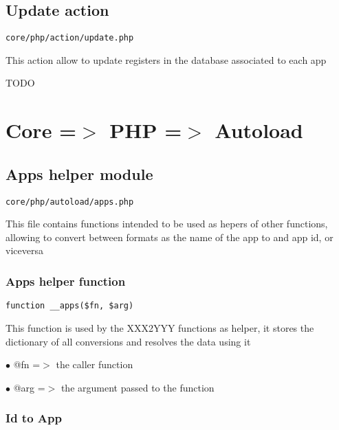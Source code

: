 \documentclass[a4paper]{book}
\begin{document}
\hypertarget{toc17}{}
\section{Update action}

\begin{lstlisting}
core/php/action/update.php
\end{lstlisting}

This action allow to update registers in the database associated to
each app

TODO


\hypertarget{toc18}{}
\chapter{Core =$>$ PHP =$>$ Autoload}

\hypertarget{toc19}{}
\section{Apps helper module}

\begin{lstlisting}
core/php/autoload/apps.php
\end{lstlisting}

This file contains functions intended to be used as hepers of other functions, allowing to convert
between formats as the name of the app to and app id, or viceversa

\hypertarget{toc20}{}
\subsection{Apps helper function}

\begin{lstlisting}
function __apps($fn, $arg)
\end{lstlisting}

This function is used by the XXX2YYY functions as helper, it stores the
dictionary of all conversions and resolves the data using it

\begin{compactitem}
\item[\color{myblue}$\bullet$] @fn  =$>$ the caller function
\item[\color{myblue}$\bullet$] @arg =$>$ the argument passed to the function
\end{compactitem}

\hypertarget{toc21}{}
\subsection{Id to App}
\end{document}
